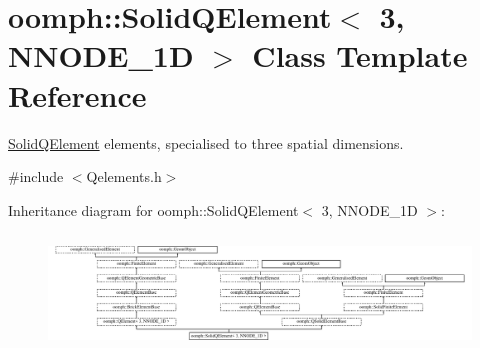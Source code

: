 \hypertarget{classoomph_1_1SolidQElement_3_013_00_01NNODE__1D_01_4}{}\section{oomph\+:\+:Solid\+Q\+Element$<$ 3, N\+N\+O\+D\+E\+\_\+1D $>$ Class Template Reference}
\label{classoomph_1_1SolidQElement_3_013_00_01NNODE__1D_01_4}


\hyperlink{classoomph_1_1SolidQElement}{Solid\+Q\+Element} elements, specialised to three spatial dimensions.  




{\ttfamily \#include $<$Qelements.\+h$>$}

Inheritance diagram for oomph\+:\+:Solid\+Q\+Element$<$ 3, N\+N\+O\+D\+E\+\_\+1D $>$\+:\begin{figure}[H]
\begin{center}
\leavevmode
\includegraphics[height=3.098814cm]{classoomph_1_1SolidQElement_3_013_00_01NNODE__1D_01_4}
\end{center}
\end{figure}
